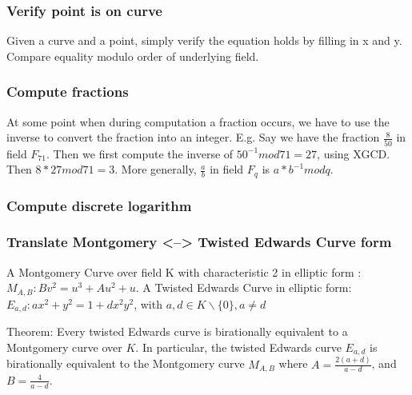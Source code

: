 \documentclass{article}
\begin{document}



\subsubsection{Verify point is on curve}
Given a curve and a point, simply verify the equation holds by filling in x and y.
Compare equality modulo order of underlying field.

\subsubsection{Compute fractions}
At some point when during computation a fraction occurs, we have to use the inverse to convert the fraction into an integer.
E.g. Say we have the fraction $\frac{8}{50}$ in field $F_{71}$. Then we first compute the inverse of $50^{-1} mod 71 = 27$, using XGCD. Then $8*27 mod 71 = 3$. More generally, $\frac{a}{b}$ in field $F_q$ is $a*b^{-1} mod q$.

\subsubsection{Compute discrete logarithm}


\subsubsection{Translate Montgomery <--> Twisted Edwards Curve form}
A Montgomery Curve over field K with characteristic 2 in elliptic form : $M_{A,B}: Bv^2 = u^3 + Au^2 + u$.
A Twisted Edwards Curve in elliptic form: $E_{a,d}: ax^2 + y^2 = 1 + dx^2y^2$, with $a,d \in K \backslash \{0\}, a \not= d$

Theorem: Every twisted Edwards curve is birationally equivalent  to a Montgomery curve over $K$.
In  particular, the twisted Edwards curve $E_{a,d}$ is birationally equivalent to the Montgomery curve $M_{A,B}$ where $A = \frac{2(a+d)}{a-d}$, and $B = \frac{4}{a-d}$.
\end{document}
